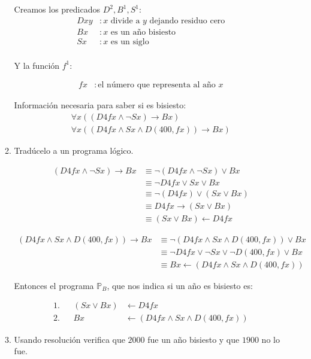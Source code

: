 \documentclass[8pt, letterpaper]{article}
\begin{document}
\begin{enumerate}
\begin{enumerate}
    Creamos los predicados $D^2, B^1, S^1$:
    \begin{align*}
      Dxy&: \text{$x$ divide a $y$ dejando residuo cero} \\
      Bx &: \text{$x$ es un año bisiesto}\\
      Sx &: \text{$x$ es un siglo}\\
    \end{align*}

    Y la función $f^1$:

    \begin{align*}
      fx &: \text{el número que representa al año $x$}
    \end{align*}
    
    Información necesaria para saber si es bisiesto:
    \begin{align*}
      \forall x((D4fx \land \neg Sx)\rightarrow Bx)\\
      \forall x((D4fx \land Sx \land D(400,fx))\rightarrow Bx)
    \end{align*}
    \newpage
  \item Tradúcelo a un programa lógico.

    \begin{align*}
      (D4fx \land \neg Sx)\rightarrow Bx &\equiv \neg (D4fx \land \neg Sx)\lor Bx\\
      &\equiv \neg D4fx \lor Sx\lor Bx\\
      &\equiv \neg (D4fx) \lor (Sx\lor Bx)\\
      &\equiv D4fx \rightarrow (Sx\lor Bx)\\
      &\equiv (Sx\lor Bx)\leftarrow D4fx
    \end{align*}

    \begin{align*}
      (D4fx \land Sx \land D(400,fx))\rightarrow Bx &\equiv \neg(D4fx \land Sx \land D(400,fx))\lor Bx\\
      &\equiv \neg D4fx \lor\neg Sx \lor\neg D(400,fx)\lor Bx\\
      &\equiv Bx\leftarrow(D4fx \land Sx \land D(400,fx))
    \end{align*}

    Entonces el programa $\mathbb{P}_B$, que nos indica si un año es bisiesto es:
    
    \begin{align*}
      1.& & (Sx\lor Bx) &\leftarrow D4fx\\
      2.& & Bx &\leftarrow(D4fx \land Sx \land D(400,fx))
    \end{align*}
  \item Usando resolución verifica que $2000$ fue un
    año bisiesto y que $1900$ no lo fue.


\end{enumerate}
\end{enumerate}
\end{document}
